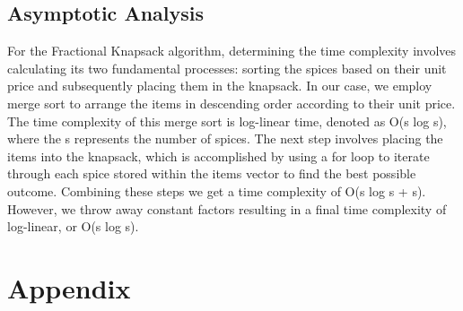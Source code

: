 \documentclass[letterpaper, 10pt,DIV=13]{scrartcl}
\numberwithin{equation}{section} %
\numberwithin{figure}{section} %
\numberwithin{table}{section} %
\begin{document}
\subsection{Asymptotic Analysis}
For the Fractional Knapsack algorithm, determining the time complexity involves calculating its two fundamental processes: sorting the spices based on their unit price and subsequently placing them in the knapsack. In our case, we employ merge sort to arrange the items in descending order according to their unit price. The time complexity of this merge sort is log-linear time, denoted as O(s log s), where the s represents the number of spices. The next step involves placing the items into the knapsack, which is accomplished by using a for loop to iterate through each spice stored within the items vector to find the best possible outcome. Combining these steps we get a time complexity of O(s log s + s). However, we throw away constant factors resulting in a final time complexity of log-linear, or O(s log s).



\pagebreak


\section{Appendix}
\end{document}
